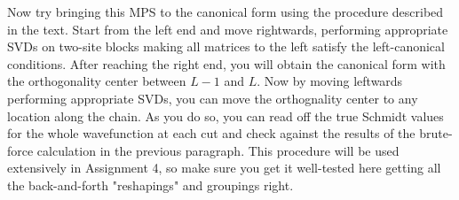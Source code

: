 \documentclass[12pt]{article}
\begin{document}
\newpage
Now try bringing this MPS to the canonical form using the procedure described in the text. Start from the left end and move rightwards, performing appropriate SVDs on two-site blocks making all matrices to the left satisfy the left-canonical conditions. After reaching the right end, you will obtain the canonical form with the orthogonality center between $L-1$ and $L$. Now by moving leftwards performing appropriate SVDs, you can move the orthognality center to any location along the chain. As you do so, you can read off the true Schmidt values for the whole wavefunction at each cut and check against the results of the brute-force calculation in the previous paragraph. This procedure will be used extensively in Assignment 4, so make sure you get it well-tested here getting all the back-and-forth "reshapings" and groupings right.
\end{document}
